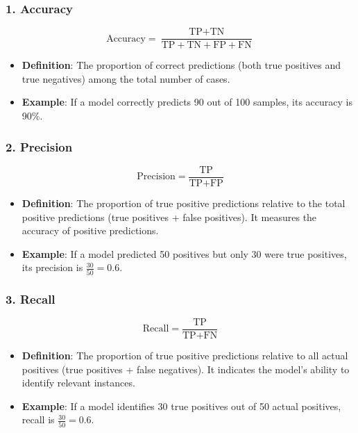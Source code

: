 \documentclass[aspectratio=169]{beamer}
\begin{document}
\begin{frame}[fragile]
    \frametitle{1. Accuracy}
    \begin{equation}
        \text{Accuracy} = \frac{\text{TP} + \text{TN}}{\text{TP} + \text{TN} + \text{FP} + \text{FN}}
    \end{equation}
    \begin{itemize}
        \item \textbf{Definition}: The proportion of correct predictions (both true positives and true negatives) among the total number of cases.
        \item \textbf{Example}: If a model correctly predicts 90 out of 100 samples, its accuracy is 90\%.
    \end{itemize}
\end{frame}

\begin{frame}[fragile]
    \frametitle{2. Precision}
    \begin{equation}
        \text{Precision} = \frac{\text{TP}}{\text{TP} + \text{FP}}
    \end{equation}
    \begin{itemize}
        \item \textbf{Definition}: The proportion of true positive predictions relative to the total positive predictions (true positives + false positives). It measures the accuracy of positive predictions.
        \item \textbf{Example}: If a model predicted 50 positives but only 30 were true positives, its precision is \( \frac{30}{50} = 0.6 \).
    \end{itemize}
\end{frame}

\begin{frame}[fragile]
    \frametitle{3. Recall}
    \begin{equation}
        \text{Recall} = \frac{\text{TP}}{\text{TP} + \text{FN}}
    \end{equation}
    \begin{itemize}
        \item \textbf{Definition}: The proportion of true positive predictions relative to all actual positives (true positives + false negatives). It indicates the model's ability to identify relevant instances.
        \item \textbf{Example}: If a model identifies 30 true positives out of 50 actual positives, recall is \( \frac{30}{50} = 0.6 \).
    \end{itemize}
\end{frame}
\end{document}
